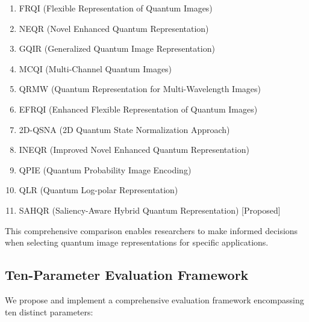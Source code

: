 \documentclass{ipol}
\begin{document}
\begin{enumerate}
\item FRQI (Flexible Representation of Quantum Images) \cite{bib18}
\item NEQR (Novel Enhanced Quantum Representation) \cite{bib19}
\item GQIR (Generalized Quantum Image Representation) \cite{bib46,bib15}
\item MCQI (Multi-Channel Quantum Images) \cite{bib47,bib13}
\item QRMW (Quantum Representation for Multi-Wavelength Images) \cite{bib48,bib49}
\item EFRQI (Enhanced Flexible Representation of Quantum Images) \cite{bib50,bib51}
\item 2D-QSNA (2D Quantum State Normalization Approach) \cite{bib52,bib53}
\item INEQR (Improved Novel Enhanced Quantum Representation) \cite{bib54,bib55}
\item QPIE (Quantum Probability Image Encoding) \cite{bib56,bib57}
\item QLR (Quantum Log-polar Representation) \cite{bib58,bib49}
\item SAHQR (Saliency-Aware Hybrid Quantum Representation) [Proposed]
\end{enumerate}

This comprehensive comparison enables researchers to make informed decisions when selecting quantum image representations for specific applications.

\subsection{Ten-Parameter Evaluation Framework}

We propose and implement a comprehensive evaluation framework encompassing ten distinct parameters:
\end{document}
